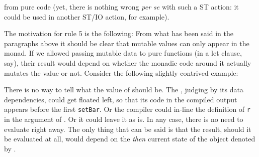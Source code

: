 from pure code (yet, there is nothing wrong \emph{per se} with such a ST action: it could be used in another ST/IO action, for example).

The motivation for rule 5 is the following: From what has been said in the paragraphs above it should be clear that mutable values can only appear in the  monad. If we allowed passing mutable data to pure functions (in a let clause, say), their result would depend on whether the monadic code around it actually mutates the value or not. Consider the following slightly contrived example:


There is no way to tell what the value of  should be. 
The , judging by its data dependencies,  could get floated left, so that its code in the compiled output appears before the first \texttt{setBar}. 
Or the compiler could in-line the definition of \texttt{r} in the argument of . 
Or it could leave it as is. 
In any case, there is no need to evaluate  right away. 
The only thing that can be said is that the result, should it be evaluated at all, would depend on the \emph{then} current state of the object denoted by .

